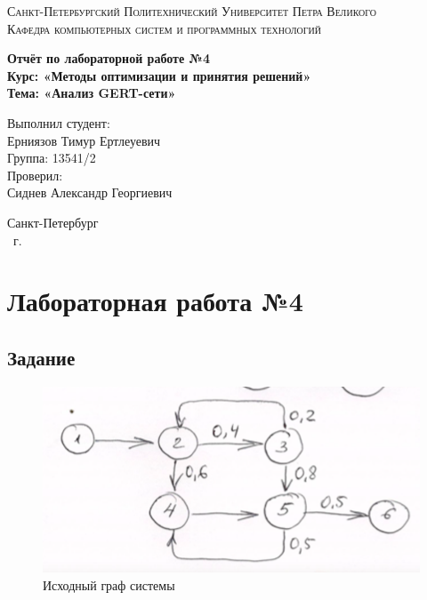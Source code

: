 \documentclass[14pt,a4paper,report]{report}
\begin{document}
\def\contentsname{Содержание}

\begin{titlepage}
	\begin{center}
		\textsc{Санкт-Петербургский Политехнический 
			Университет Петра Великого\\[5mm]
			Кафедра компьютерных систем и программных технологий}
		
		\vfill
		
		\textbf{Отчёт по лабораторной работе №4\\[3mm]
			Курс: «Методы оптимизации и принятия решений»\\[3mm]
			Тема: «Анализ GERT-сети»\\[35mm]
			}
	\end{center}
	
	\hfill
	\begin{minipage}{.5\textwidth}
		Выполнил студент:\\[2mm] 
		Ерниязов Тимур Ертлеуевич\\
		Группа: 13541/2\\[5mm]
		
		Проверил:\\[2mm] 
		Сиднев Александр Георгиевич
	\end{minipage}
	\vfill
	\begin{center}
		Санкт-Петербург\\ \the\year\ г.
	\end{center}
\end{titlepage}

\tableofcontents
\clearpage

\chapter{Лабораторная работа №4}

\section{Задание}

\begin{figure}[h!]
	\centering
	\includegraphics[scale = 0.55]{images/0.png}
	\caption{Исходный граф системы}
	\label{image:0}
\end{figure}
\end{document}
